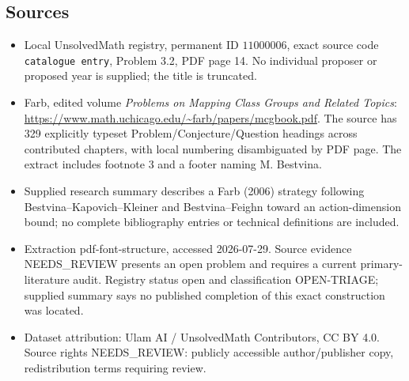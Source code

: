 \documentclass[11pt]{article}
\begin{document}
\subsection{Sources}
\begin{itemize}
\item Local UnsolvedMath registry, permanent ID \(11000006\), exact source code \texttt{catalogue entry}, Problem 3.2, PDF page 14. No individual proposer or proposed year is supplied; the title is truncated.
\item Farb, edited volume \emph{Problems on Mapping Class Groups and Related Topics}: \url{https://www.math.uchicago.edu/~farb/papers/mcgbook.pdf}. The source has 329 explicitly typeset Problem/Conjecture/Question headings across contributed chapters, with local numbering disambiguated by PDF page. The extract includes footnote 3 and a footer naming M. Bestvina.
\item Supplied research summary describes a Farb (2006) strategy following Bestvina--Kapovich--Kleiner and Bestvina--Feighn toward an action-dimension bound; no complete bibliography entries or technical definitions are included.
\item Extraction pdf-font-structure, accessed 2026-07-29. Source evidence NEEDS\_REVIEW presents an open problem and requires a current primary-literature audit. Registry status open and classification OPEN-TRIAGE; supplied summary says no published completion of this exact construction was located.
\item Dataset attribution: Ulam AI / UnsolvedMath Contributors, CC BY 4.0. Source rights NEEDS\_REVIEW: publicly accessible author/publisher copy, redistribution terms requiring review.
\end{itemize}
\end{document}
